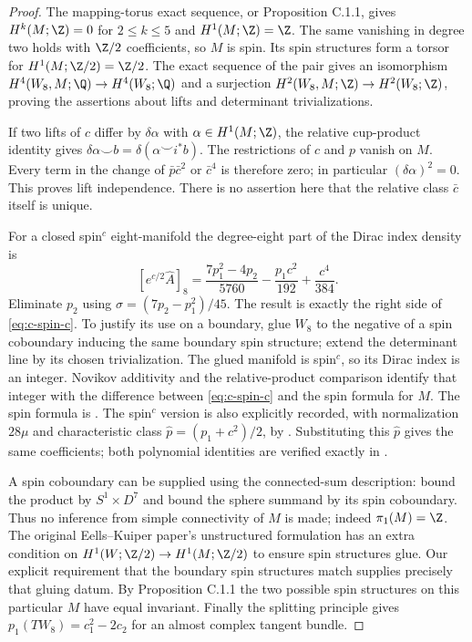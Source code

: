 \begin{proof}
The mapping-torus exact sequence, or Proposition C.1.1, gives
$H^k(M;\Z)=0$ for $2\leq k\leq5$ and $H^1(M;\Z)=\Z$.
The same vanishing in degree two holds with $\Z/2$ coefficients,
so $M$ is spin. Its spin structures form a torsor for
$H^1(M;\Z/2)=\Z/2$. The exact sequence of the pair gives an
isomorphism
$H^4(W_8,M;\Q)\to H^4(W_8;\Q)$ and a surjection
$H^2(W_8,M;\Z)\to H^2(W_8;\Z)$, proving the assertions
about lifts and determinant trivializations.

If two lifts of $c$ differ by $\delta\alpha$ with
$\alpha\in H^1(M;\Z)$, the relative cup-product identity gives
$\delta\alpha\smile b=\delta(\alpha\smile i^*b)$.
The restrictions of $c$ and $p$ vanish on $M$. Every term in the
change of $\bar p\bar c^2$ or $\bar c^4$ is therefore zero;
in particular $(\delta\alpha)^2=0$. This proves lift independence.
There is no assertion here that the relative class $\bar c$ itself
is unique.

For a closed spin$^c$ eight-manifold the degree-eight part of the
Dirac index density is
\[
 [e^{c/2}\widehat A]_8
 =\frac{7p_1^2-4p_2}{5760}
       -\frac{p_1c^2}{192}+\frac{c^4}{384}.
\]
Eliminate $p_2$ using $\sigma=(7p_2-p_1^2)/45$.
The result is exactly the right side of
\eqref{eq:c-spin-c}. To justify its use on a boundary, glue $W_8$
to the negative of a spin coboundary inducing the same boundary spin
structure; extend the determinant line by its chosen trivialization.
The glued manifold is spin$^c$, so its Dirac index is an integer.
Novikov additivity and the relative-product comparison identify that
integer with the difference between \eqref{eq:c-spin-c} and the
spin formula for $M$. The spin formula is
\citet[Section 6, equation (11)]{EellsKuiper1962}.
The spin$^c$ version is also explicitly recorded, with normalization
$28\mu$ and characteristic class
$\widehat p=(p_1+c^2)/2$, by
\citet[Section 2.2, equation (2.1)]{CrowleyNordstrom2020}.
Substituting this $\widehat p$ gives the same coefficients; both
polynomial identities are verified exactly in .

A spin coboundary can be supplied using the connected-sum description:
bound the product by $S^1\times D^7$ and bound the sphere summand
by its spin coboundary. Thus no inference from simple connectivity of
$M$ is made; indeed $\pi_1(M)=\Z$. The original Eells--Kuiper
paper's unstructured formulation has an extra condition on
$H^1(W;\Z/2)\to H^1(M;\Z/2)$ to ensure spin structures glue.
Our explicit requirement that the boundary spin structures match
supplies precisely that gluing datum. By Proposition C.1.1 the two
possible spin structures on this particular $M$ have equal invariant.
Finally the splitting principle gives
$p_1(TW_8)=c_1^2-2c_2$ for an almost complex tangent bundle.
\end{proof}

